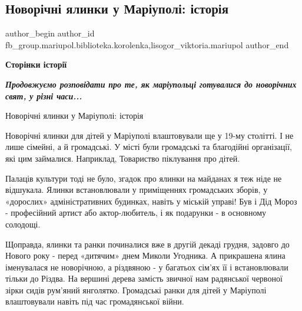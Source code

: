  
 
 
 
 

\subsection{Новорічні ялинки у Маріуполі: історія}
\label{sec:23_12_2022.fb.fb_group.mariupol.biblioteka.korolenka.1.novor_chn__yalinki_u}
 
\ifcmt
 author_begin
   author_id fb_group.mariupol.biblioteka.korolenka,lisogor_viktoria.mariupol
 author_end
\fi

\textbf{Сторінки історії}

\begingroup
\em\bfseries
Продовжуємо розповідати про те, як маріупольці готувалися до новорічних свят, у різні часи...

Новорічні ялинки у Маріуполі: історія
\endgroup

Новорічні ялинки для дітей у Маріуполі влаштовували ще у 19-му столітті. І не
лише сімейні, а й громадські. У місті були громадські та благодійні
організації, які цим займалися. Наприклад, Товариство піклування про дітей.

Палаців культури тоді не було, згадок про ялинки на майданах я теж ніде не
відшукала. Ялинки встановлювали у приміщеннях громадських зборів, у «дорослих»
адміністративних будинках, навіть у міській управі! Був і Дід Мороз -
професійний артист або актор-любитель, і як подарунки - в основному солодощі.

Щоправда, ялинки та ранки починалися вже в другій декаді грудня, задовго до
Нового року - перед «дитячим» днем Миколи Угодника. А прикрашена ялина
іменувалася не новорічною, а різдвяною - у багатьох сім'ях її і встановлювали
тільки до Різдва. На вершині дерева замість звичної нам радянської червоної
зірки сидів рум'яний янголятко. Громадські ранки для дітей у Маріуполі
влаштовували навіть під час громадянської війни.

